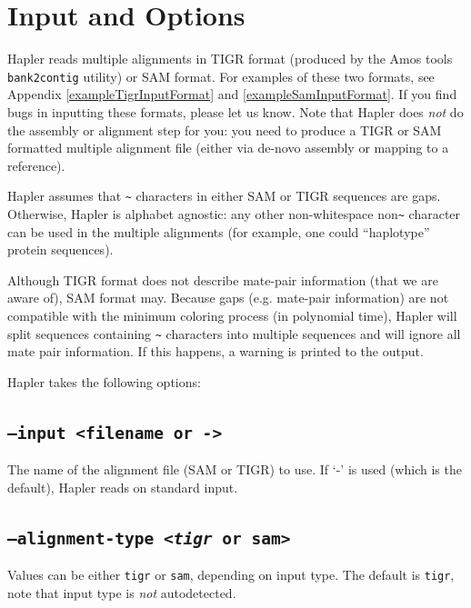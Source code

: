 \documentclass[11pt]{llncs}
\begin{document}
\newpage

\section{Input and Options}
\label{inputAndOptions}

Hapler reads multiple alignments in TIGR format (produced by the Amos tools \verb=bank2contig= utility) or SAM format. For examples of these two 
formats, see Appendix \ref{exampleTigrInputFormat} and \ref{exampleSamInputFormat}. If you find bugs in inputting these formats, please let us know. 
Note that Hapler does \emph{not} do the assembly or alignment step for you: you need to produce a TIGR or SAM formatted multiple alignment file 
(either via de-novo assembly or mapping to a reference).

Hapler assumes that \verb=~= characters in either SAM or TIGR sequences are gaps. Otherwise, Hapler is alphabet agnostic: any other non-whitespace
non\verb=~= character can be used in the multiple alignments (for example, one could ``haplotype'' protein sequences). 

Although TIGR format does not describe mate-pair information (that we are aware of), SAM format may. Because gaps (e.g. mate-pair information) are 
not compatible with the minimum coloring process (in polynomial time), Hapler will split sequences containing \texttt{\~} characters into multiple
sequences and will ignore all mate pair information. If this happens, a warning is printed to the output. 


Hapler takes the following options:

\subsection{\texttt{--input <filename or \emph{-}>}}

The name of the alignment file (SAM or TIGR) to use. If `-' is used (which is the default), Hapler reads on standard input.

\subsection{\texttt{--alignment-type <\emph{tigr} or sam>}}

Values can be either \verb=tigr= or \verb=sam=, depending on input type. The default is \verb=tigr=, note that input type is \emph{not}
autodetected.

\end{document}
